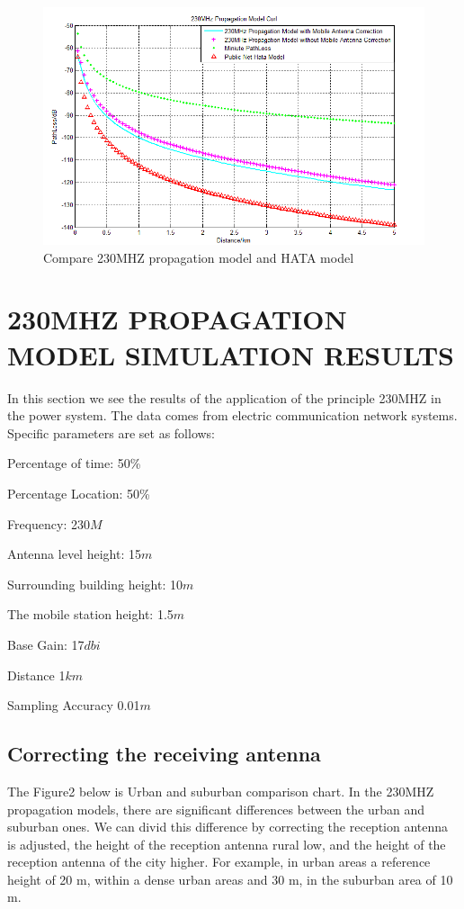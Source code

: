 \documentclass[12pt,a4paper,twocolumn,fleqn]{narms}
\begin{document}
{\begin{figure}
\centerline{\includegraphics[width=15cm]{differentspace.png}}
\caption{Compare 230MHZ propagation model and HATA model }
\end{figure}

\section{230MHZ PROPAGATION MODEL SIMULATION RESULTS}

In this section we see the results of the application of the principle 230MHZ in the power system. The data comes from electric communication network systems. Specific parameters are set as follows:

Percentage of time: 50\% 

Percentage Location: 50\% 

Frequency: 230$M$ 

Antenna level height: 15$m$ 

Surrounding building height: 10$m$ 

The mobile station height: 1.5$m$ 

Base Gain: 17$dbi$ 

Distance 1$km$ 

Sampling Accuracy 0.01$m$

\subsection{Correcting the receiving antenna}

The Figure2 below is Urban and suburban comparison chart. In the 230MHZ propagation models, there are significant differences between the urban and suburban ones.  We can divid this difference by correcting the reception antenna is adjusted, the height of the reception antenna rural low, and the height of the reception antenna of the city higher. For example, in urban areas a reference height of 20 m, within a dense urban areas and 30 m, in the suburban area of 10 m.

}
\end{document}
